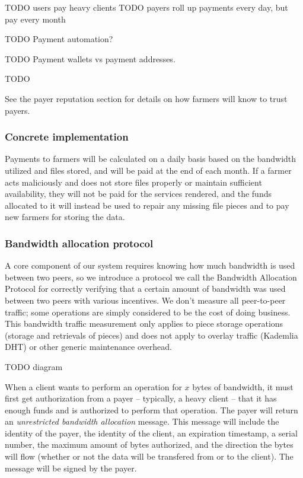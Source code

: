 \documentclass[a4paper,10pt]{article} \usepackage[utf8]{inputenc}
\newcommand{\todo}[1]{{\color{red} TODO #1 }}
\begin{document}
\todo{users pay heavy clients}
\todo{payers roll up payments every day, but pay every month}

\todo{Payment automation?}

\todo{Payment wallets vs payment addresses. }

\todo{}

See the payer reputation section for details on
how farmers will know to trust payers.

\subsubsection{Concrete implementation}

Payments to farmers will be calculated on a daily basis based on the bandwidth
utilized and files stored, and will be paid at the end of each month. 
If a farmer acts
maliciously and does not store files properly or maintain sufficient
availability, they will not be paid for the services rendered, and the funds
allocated to it will instead be used to repair any missing
file pieces and to pay new farmers for storing the data.

\subsubsection{Bandwidth allocation protocol}

A core component of our system requires knowing how much bandwidth is used
between two peers, so we introduce a protocol we call the Bandwidth Allocation
Protocol for correctly verifying that a certain amount of bandwidth was used
between two peers with various incentives. 
We don't measure all peer-to-peer traffic; 
some operations are simply considered to be
the cost of doing business. This bandwidth traffic measurement only applies
to piece storage operations (storage and retrievals of pieces) and does not
apply to overlay traffic (Kademlia DHT) or other generic maintenance overhead.

\todo{diagram}

When a client wants to perform an operation for $x$ bytes of bandwidth, it must
first get authorization from a payer -- typically, a heavy client -- 
that it has enough funds and is authorized to perform that operation. 
The payer will return an {\em unrestricted
bandwidth allocation} message. This message will include the identity of the
payer, the identity of the client, an expiration timestamp, a serial number,
the maximum amount of bytes authorized, and the direction the bytes will flow
(whether or not the data will be transfered from or to the client).
The message will be signed by the payer. 
\end{document}
